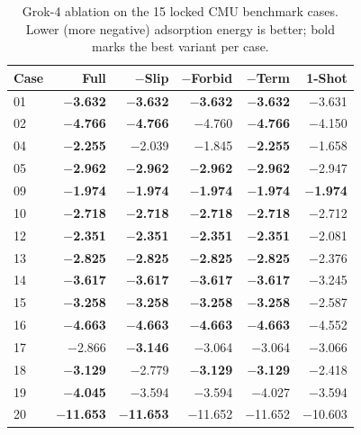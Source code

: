 \begin{table}[h]
\centering
\small
\caption{Grok-4 ablation on the 15 locked CMU benchmark cases. Lower (more negative) adsorption energy is better; bold marks the best variant per case.}
\label{tab:si-ablation-grok}
\begin{tabular}{lrrrrr}
\toprule
Case & Full & $-$Slip & $-$Forbid & $-$Term & 1-Shot \\
\midrule
01 & \textbf{$-$3.632} & \textbf{$-$3.632} & \textbf{$-$3.632} & \textbf{$-$3.632} & $-$3.631 \\
02 & \textbf{$-$4.766} & \textbf{$-$4.766} & $-$4.760 & \textbf{$-$4.766} & $-$4.150 \\
04 & \textbf{$-$2.255} & $-$2.039 & $-$1.845 & \textbf{$-$2.255} & $-$1.658 \\
05 & \textbf{$-$2.962} & \textbf{$-$2.962} & \textbf{$-$2.962} & \textbf{$-$2.962} & $-$2.947 \\
09 & \textbf{$-$1.974} & \textbf{$-$1.974} & \textbf{$-$1.974} & \textbf{$-$1.974} & \textbf{$-$1.974} \\
10 & \textbf{$-$2.718} & \textbf{$-$2.718} & \textbf{$-$2.718} & \textbf{$-$2.718} & $-$2.712 \\
12 & \textbf{$-$2.351} & \textbf{$-$2.351} & \textbf{$-$2.351} & \textbf{$-$2.351} & $-$2.081 \\
13 & \textbf{$-$2.825} & \textbf{$-$2.825} & \textbf{$-$2.825} & \textbf{$-$2.825} & $-$2.376 \\
14 & \textbf{$-$3.617} & \textbf{$-$3.617} & \textbf{$-$3.617} & \textbf{$-$3.617} & $-$3.245 \\
15 & \textbf{$-$3.258} & \textbf{$-$3.258} & \textbf{$-$3.258} & \textbf{$-$3.258} & $-$2.587 \\
16 & \textbf{$-$4.663} & \textbf{$-$4.663} & \textbf{$-$4.663} & \textbf{$-$4.663} & $-$4.552 \\
17 & $-$2.866 & \textbf{$-$3.146} & $-$3.064 & $-$3.064 & $-$3.066 \\
18 & \textbf{$-$3.129} & $-$2.779 & \textbf{$-$3.129} & \textbf{$-$3.129} & $-$2.418 \\
19 & \textbf{$-$4.045} & $-$3.594 & $-$3.594 & $-$4.027 & $-$3.594 \\
20 & \textbf{$-$11.653} & \textbf{$-$11.653} & $-$11.652 & $-$11.652 & $-$10.603 \\
\bottomrule
\end{tabular}
\end{table}

